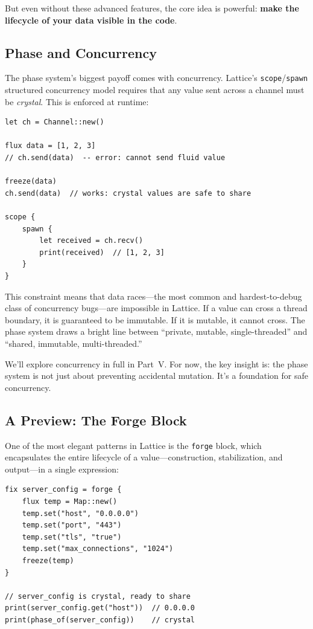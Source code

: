 But even without these advanced features, the core idea is powerful: \textbf{make the lifecycle of your data visible in the code}.

\subsection{Phase and Concurrency}\label{subsec:phase-concurrency}

The phase system's biggest payoff comes with concurrency.
Lattice's \lstinline|scope|/\lstinline|spawn| structured concurrency model requires that any value sent across a channel must be \emph{crystal}.
This is enforced at runtime:

\begin{lstlisting}[language=Lattice, caption={Phase and concurrency}]
let ch = Channel::new()

flux data = [1, 2, 3]
// ch.send(data)  -- error: cannot send fluid value

freeze(data)
ch.send(data)  // works: crystal values are safe to share

scope {
    spawn {
        let received = ch.recv()
        print(received)  // [1, 2, 3]
    }
}
\end{lstlisting}

This constraint means that data races---the most common and hardest-to-debug class of concurrency bugs---are impossible in Lattice.
If a value can cross a thread boundary, it is guaranteed to be immutable.
If it is mutable, it cannot cross.
The phase system draws a bright line between ``private, mutable, single-threaded'' and ``shared, immutable, multi-threaded.''

We'll explore concurrency in full in Part~V\@.
For now, the key insight is: the phase system is not just about preventing accidental mutation.
It's a foundation for safe concurrency.

\subsection{A Preview: The Forge Block}\label{subsec:forge-preview}

One of the most elegant patterns in Lattice is the \lstinline|forge| block, which encapsulates the entire lifecycle of a value---construction, stabilization, and output---in a single expression:

\begin{lstlisting}[language=Lattice, caption={Forge: build fluid, end crystal}]
fix server_config = forge {
    flux temp = Map::new()
    temp.set("host", "0.0.0.0")
    temp.set("port", "443")
    temp.set("tls", "true")
    temp.set("max_connections", "1024")
    freeze(temp)
}

// server_config is crystal, ready to share
print(server_config.get("host"))  // 0.0.0.0
print(phase_of(server_config))    // crystal
\end{lstlisting}

